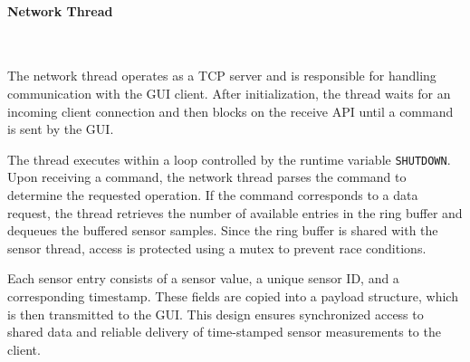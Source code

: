 \paragraph{Network Thread}\

The network thread operates as a TCP server and is responsible for handling communication 
with the GUI client. After initialization, the thread waits for an incoming client 
connection and then blocks on the receive API until a command is sent by the GUI.

The thread executes within a loop controlled by the runtime variable \texttt{SHUTDOWN}. 
Upon receiving a command, the network thread parses the command to determine the requested 
operation. If the command corresponds to a data request, the thread retrieves the number 
of available entries in the ring buffer and dequeues the buffered sensor samples. Since 
the ring buffer is shared with the sensor thread, access is protected using a mutex to 
prevent race conditions.

Each sensor entry consists of a sensor value, a unique sensor ID, and a corresponding 
timestamp. These fields are copied into a payload structure, which is then transmitted 
to the GUI. This design ensures synchronized access to shared data and reliable delivery 
of time-stamped sensor measurements to the client.

